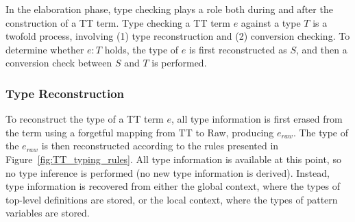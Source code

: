 
In the elaboration phase, type checking plays a role both during and after the
construction of a TT term. Type checking a TT term $e$ against a type $T$ is a
twofold process, involving (1) type reconstruction and (2) conversion
checking. To determine whether $e : T$ holds, the type of $e$ is first
reconstructed as $S$, and then a conversion check between $S$ and $T$ is performed.

\subsubsection{Type Reconstruction}
To reconstruct the type of a TT term $e$, all type information is first erased from
the term using a forgetful mapping from TT to Raw, producing $e_{raw}$. The type of the $e_{raw}$ is
then reconstructed according to the rules presented in
Figure~\ref{fig:TT_typing_rules}. All type information is available at this
point, so no type inference is performed (no new type information is
derived). Instead, type information is recovered from either the global context,
where the types of top-level definitions are stored, or the local context, where
the types of pattern variables are stored.

